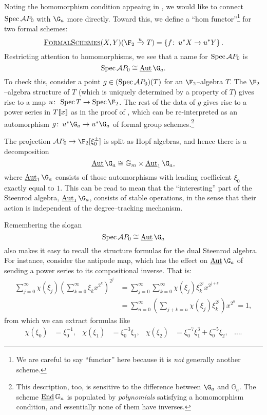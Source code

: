 \begin{example}\label{FirstAppearanceOfInternalAut}
Noting the homomorphism condition appeaing in , we would like to connect \(\operatorname{Spec} \mathcal AP_0\) with \(\G_a\) more directly.  Toward this, we define a ``hom functor''\footnote{We are careful to say ``functor'' here because it is \emph{not} generally another scheme.} for two formal schemes: \[\InternalHom{FormalSchemes}(X, Y)(\F_2 \xrightarrow{u} T) = \left\{ f\co u^* X \to u^* Y \right\}.\]  Restricting attention to homomorphisms, we see that a name for \(\operatorname{Spec} \mathcal AP_0\) is \[\Spec \mathcal AP_0 \cong \InternalAut \G_a.\]  To check this, consider a point \(g \in (\operatorname{Spec} \mathcal AP_0)(T)\) for an \(\F_2\)--algebra \(T\).  The \(\F_2\)--algebra structure of \(T\) (which is uniquely determined by a property of \(T\)) gives rise to a map \(u\co \Spec T \to \Spec \F_2\).  The rest of the data of \(g\) gives rise to a power series in \(T\llbracket{x}\rrbracket\) as in the proof of , which can be re-interpreted as an automorphism \(g\co u^* \G_a \to u^* \G_a\) of formal group schemes.\footnote{This description, too, is sensitive to the difference between \(\G_a\) and \(\mathbb G_a\).  The scheme \(\operatorname{\underline{\smash{\operatorname{End}}}} \mathbb G_a\) is populated by \emph{polynomials} satisfying a homomorphism condition, and essentially none of them have inverses.}
\end{example}

\begin{remark}\label{AutGaHasStableCoopns}
The projection \(\mathcal AP_0 \to \F_2[\xi_0^\pm]\) is split as Hopf algebras, and hence there is a decomposition \[\InternalAut \G_a \cong \Gm \times \InternalAut_1 \G_a,\] where \(\InternalAut_1 \G_a\) consists of those automorphisms with leading coefficient \(\xi_0\) exactly equal to \(1\).  This can be read to mean that the ``interesting'' part of the Steenrod algebra, \(\InternalAut_1 \G_a\), consists of stable operations, in the sense that their action is independent of the degree--tracking mechanism.
\end{remark}

\begin{example}
Remembering the slogan \[\Spec \mathcal AP_0 \cong \InternalAut \G_a\] also makes it easy to recall the structure formulas for the dual Steenrod algebra.  For instance, consider the antipode map, which has the effect on \(\InternalAut \G_a\) of sending a power series to its compositional inverse.  That is:
\begin{align*}
\sum_{j=0}^\infty \chi(\xi_j) \left( \sum_{k=0}^\infty \xi_k x^{2^k} \right)^{2^j} & = \sum_{j=0}^\infty \sum_{k=0}^\infty \chi(\xi_j) \xi_k^{2^j} x^{2^{j+k}} \\
& = \sum_{n=0}^\infty \left( \sum_{j+k=n} \chi(\xi_j) \xi_k^{2^j} \right) x^{2^n} = 1,
\end{align*}
from which we can extract formulas like
\begin{align*}
\chi(\xi_0) & = \xi_0^{-1}, &
\chi(\xi_1) & = \xi_0^{-3} \xi_1, &
\chi(\xi_2) & = \xi_0^{-7} \xi_1^3 + \xi_0^{-5} \xi_2, &
\ldots.
\end{align*}
\end{example}

